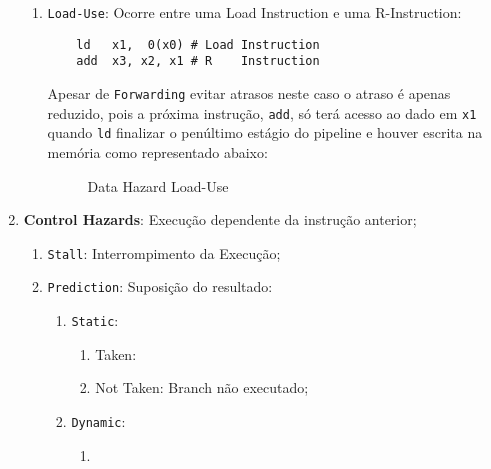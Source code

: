 \documentclass{article}
\begin{document}
\begin{enumerate}[rightmargin = \leftmargin]
\begin{enumerate}[rightmargin = \leftmargin]
        \item \texttt{Load-Use}: Ocorre entre uma Load Instruction e uma R-Instruction:
        \begin{scriptsize}
            \myStyleRISCV
            \begin{lstlisting}
    ld   x1,  0(x0) # Load Instruction
    add  x3, x2, x1 # R    Instruction
            \end{lstlisting}
        \end{scriptsize}
        Apesar de \texttt{Forwarding} evitar atrasos neste caso o atraso é apenas reduzido, pois a próxima instrução, \texttt{add}, só terá acesso ao dado em \texttt{x1} quando \texttt{ld} finalizar o penúltimo estágio do pipeline e houver escrita na memória como representado abaixo:
        \begin{figure}[H]
            \centering
            \caption{Data Hazard Load-Use}
            \label{hazardDataLoadUse}
        \end{figure}
    \end{enumerate}

    \item \textbf{Control Hazards}: Execução dependente da instrução anterior;
    \begin{enumerate}[rightmargin = \leftmargin]
        \item \texttt{Stall}: Interrompimento da Execução;

        \item \texttt{Prediction}: Suposição do resultado:
        \begin{enumerate}
            \item \texttt{Static}:
            \begin{enumerate}[noitemsep, rightmargin = \leftmargin]
                \item Taken:
                \item Not Taken: Branch não executado;
            \end{enumerate}
            \item \texttt{Dynamic}:
            \begin{enumerate}[noitemsep, rightmargin = \leftmargin]
                \item 
            \end{enumerate}
        \end{enumerate}
    \end{enumerate}
\end{enumerate}
\end{document}
